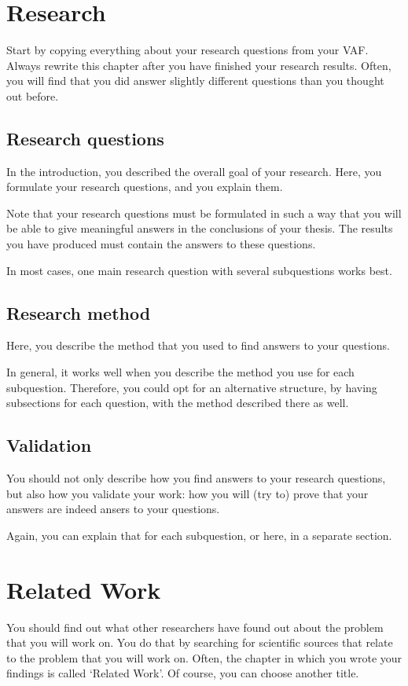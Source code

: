 \documentclass[oneside]{ou-report}
\begin{document}
\chapter{Research}
Start by copying everything about your research questions from your VAF. Always rewrite this chapter after you have finished your research results. Often, you will find that you did answer slightly different questions than you thought out before.

\section{Research questions}
In the introduction, you described the overall goal of your research.
Here, you formulate your research questions, and you explain them.

Note that your research questions must be formulated in such a way that you will be able to give meaningful answers in the conclusions of your thesis. The results you have produced must contain the answers to these questions.

In most cases, one main research question with several subquestions works best.

\section{Research method}
Here, you describe the method that you used to find answers to your questions. 

In general, it works well when you describe the method you use for each subquestion.  Therefore, you could opt for an alternative structure, by having subsections for each question, with the method described there as well.

\section{Validation}
You should not only describe how you find answers to your research questions, but also how you validate your work: how you will (try to) prove that your answers are indeed ansers to your questions.

Again, you can explain that for each subquestion, or here, in a separate section.

\chapter{Related Work}
You should find out what other researchers have found out about the problem that you will work on. You do that by searching for scientific sources that relate to the problem that you will work on. Often, the chapter in which you wrote your findings is called `Related Work'. Of course, you can choose another title.
\end{document}
